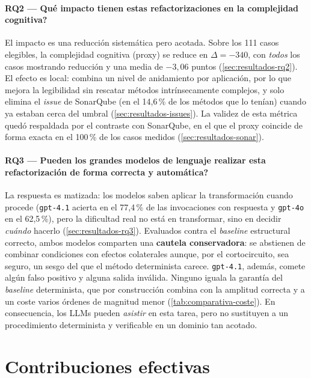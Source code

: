 \paragraph{RQ2 — \textquestiondown{}Qué impacto tienen estas refactorizaciones en la complejidad
cognitiva?} El impacto es una reducción sistemática pero acotada. Sobre los 111
casos elegibles, la complejidad cognitiva (proxy) se reduce en
$\Delta = -340$, con \emph{todos} los casos mostrando reducción y una media de
$-3{,}06$ puntos (\autoref{sec:resultados-rq2}). El efecto es local: combina un
nivel de anidamiento por aplicación, por lo que mejora la legibilidad sin
rescatar métodos intrínsecamente complejos, y solo elimina el \emph{issue} de
SonarQube (en el 14{,}6\,\% de los métodos que lo tenían) cuando ya estaban
cerca del umbral (\autoref{sec:resultados-issues}). La validez de esta métrica
quedó respaldada por el contraste con SonarQube, en el que el proxy coincide de
forma exacta en el 100\,\% de los casos medidos (\autoref{sec:resultados-sonar}).

\paragraph{RQ3 — \textquestiondown{}Pueden los grandes modelos de lenguaje realizar esta
refactorización de forma correcta y automática?} La respuesta es matizada: los
modelos saben aplicar la transformación cuando procede (\texttt{gpt-4.1} acierta
en el 77{,}4\,\% de las invocaciones con respuesta y \texttt{gpt-4o} en el
62{,}5\,\%), pero la dificultad real no está en transformar, sino en decidir
\emph{cuándo} hacerlo (\autoref{sec:resultados-rq3}). Evaluados contra el
\emph{baseline} estructural correcto, ambos modelos comparten una \textbf{cautela
conservadora}: se abstienen de combinar condiciones con efectos colaterales
aunque, por el cortocircuito, sea seguro, un sesgo del que el método
determinista carece. \texttt{gpt-4.1}, además,
comete algún falso positivo y alguna salida inválida. Ninguno iguala la garantía
del \emph{baseline} determinista, que por construcción combina con la amplitud
correcta y a un coste varios órdenes de magnitud menor
(\autoref{tab:comparativa-coste}). En consecuencia, los LLMs pueden \emph{asistir}
en esta tarea, pero no sustituyen a un procedimiento determinista y verificable
en un dominio tan acotado.

\section{Contribuciones efectivas}

